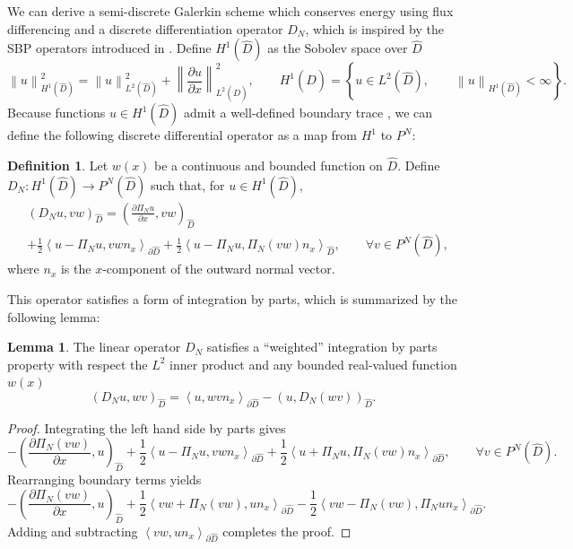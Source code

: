 \documentclass[preprint,10pt]{elsarticle}
\theoremstyle{definition}
\newtheorem{definition}{Definition}
\theoremstyle{lemma}
\newtheorem{lemma}{Lemma}
\theoremstyle{theorem}
\theoremstyle{assumption}
\newcommand{\pd}[2]{\frac{\partial#1}{\partial#2}}
\newcommand{\nor}[1]{\left\| #1 \right\|}
\newcommand{\LRp}[1]{\left( #1 \right)}
\newcommand{\LRa}[1]{\left\langle #1 \right\rangle}
\newcommand{\LRc}[1]{\left\{ #1 \right\}}
\begin{document}
We can derive a semi-discrete Galerkin scheme which conserves energy using flux differencing and a discrete differentiation operator $D_N$, which is inspired by the SBP operators introduced in \cite{chen2017entropy}.  Define $H^1\LRp{\widehat{D}}$ as the Sobolev space over $\widehat{D}$
\begin{equation}
\nor{u}_{H^1\LRp{\widehat{D}}}^2 = \nor{u}_{L^2\LRp{\widehat{D}}}^2 + \nor{\pd{u}{x}}_{L^2\LRp{\widehat{D}}}^2, \qquad H^1\LRp{\widehat{D}} = \LRc{ u \in L^2\LRp{\widehat{D}}, \qquad \nor{u}_{H^1\LRp{\widehat{D}}} < \infty}.\label{eq:sobolev}
\end{equation}
Because functions $u \in H^1\LRp{\widehat{D}}$ admit a well-defined boundary trace \cite{brenner2007mathematical}, we can define the following discrete differential operator as a map from $H^1$ to $P^N$:
\begin{definition}
\label{def:dgd}
Let $w(x)$ be a continuous and bounded function on $\widehat{D}$.  Define $D_N: H^1\LRp{\widehat{D}}\rightarrow P^N\LRp{\widehat{D}}$ such that, for $u\in H^1\LRp{\widehat{D}}$, 
\begin{align}
&\LRp{D_N u, vw}_{\widehat{D}} = \LRp{\pd{ \Pi_N u}{x},vw}_{\widehat{D}}\nonumber \\
&+ \frac{1}{2}{\LRa{{u - \Pi_N u}, vw{n}_x}}_{\partial \widehat{D}} + \frac{1}{2}\LRa{u - \Pi_Nu ,\Pi_N\LRp{vw}{n}_x }_{\widehat{D}}, \qquad \forall v\in P^N\LRp{\widehat{D}},
\end{align}
where ${n}_x$ is the $x$-component of the outward normal vector.  
\end{definition}
This operator satisfies a form of integration by parts, which is summarized by the following lemma:
\begin{lemma}
\label{lemma:dgd_local}
The linear operator $D_N$ satisfies a ``weighted'' integration by parts property with respect the $L^2$ inner product and any bounded real-valued function $w(x)$ 
\[
\LRp{D_N u, wv}_{\widehat{D}} = \LRa{u,wv{n}_x}_{\partial \widehat{D}} - \LRp{u,D_N (w v)}_{\widehat{D}}.
\]
\end{lemma}
\begin{proof}
Integrating the left hand side by parts gives
\[
-\LRp{\pd{ \Pi_N (vw)}{x},u}_{\widehat{D}} + \frac{1}{2}{\LRa{{u - \Pi_N u}, vw{n}_x}}_{\partial \widehat{D}} + \frac{1}{2}\LRa{u + \Pi_Nu ,\Pi_N\LRp{vw}{n}_x }_{\partial \widehat{D}}, \qquad \forall v\in P^N\LRp{\widehat{D}}.
\]
Rearranging boundary terms yields
\[
-\LRp{\pd{ \Pi_N (vw)}{x},u}_{\widehat{D}} + \frac{1}{2}\LRa{vw + \Pi_N(vw) , u{n}_x }_{\partial \widehat{D}}  - \frac{1}{2}\LRa{vw - \Pi_N (vw), \Pi_N u {n}_x}_{\partial \widehat{D}}.  
\]
Adding and subtracting $\LRa{vw,u{n}_x}_{\partial \widehat{D}}$ completes the proof.
\end{proof}
\end{document}
